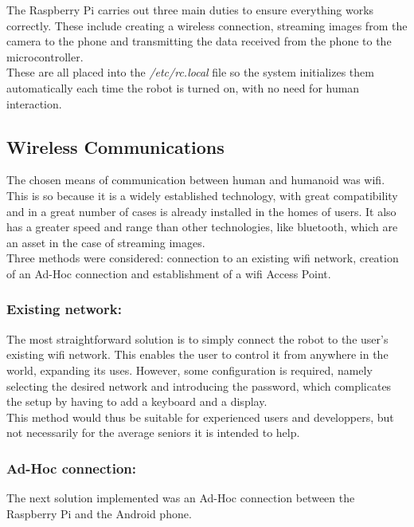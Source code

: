 The Raspberry Pi carries out three main duties to ensure everything works correctly. These include creating a wireless connection, streaming images from the camera to the phone and transmitting the data received from the phone to the microcontroller.\\

 These are all placed into the \textit{/etc/rc.local} file so the system initializes them automatically each time the robot is turned on, with no need for human interaction.

\subsection{Wireless Communications}%

The chosen means of communication between human and humanoid was wifi. This is so because it is a widely established technology, with great compatibility and in a great number of cases is already installed in the homes of users. It also has a greater speed and range than other technologies, like bluetooth, which are an asset in the case of streaming images.\\

Three methods were considered: connection to an existing wifi network, creation of an Ad-Hoc connection and establishment of a wifi Access Point.

\subsubsection{Existing network:}

The most straightforward solution is to simply connect the robot to the user's existing wifi network. This enables the user to control it from anywhere in the world, expanding its uses. However, some configuration is required, namely selecting the desired network and introducing the password, which complicates the setup by having to add a keyboard and a display.\\

This method would thus be suitable for experienced users and developpers, but not necessarily for the average seniors it is intended to help.

\subsubsection{Ad-Hoc connection:}

The next solution implemented was an Ad-Hoc connection between the Raspberry Pi and the Android phone.\\

